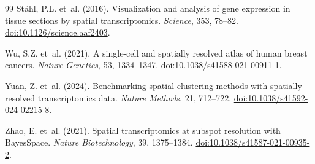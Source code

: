 \documentclass[12pt]{article}
\begin{document}
\begin{thebibliography}{99}
St{\aa}hl, P.L. et~al. (2016). Visualization and analysis of gene expression
in tissue sections by spatial transcriptomics. \emph{Science}, 353, 78--82.
\href{https://doi.org/10.1126/science.aaf2403}{doi:10.1126/science.aaf2403}.

Wu, S.Z. et~al. (2021). A single-cell and spatially resolved atlas of human
breast cancers. \emph{Nature Genetics}, 53, 1334--1347.
\href{https://doi.org/10.1038/s41588-021-00911-1}{doi:10.1038/s41588-021-00911-1}.

Yuan, Z. et~al. (2024). Benchmarking spatial clustering methods with spatially
resolved transcriptomics data. \emph{Nature Methods}, 21, 712--722.
\href{https://doi.org/10.1038/s41592-024-02215-8}{doi:10.1038/s41592-024-02215-8}.

Zhao, E. et~al. (2021). Spatial transcriptomics at subspot resolution with
BayesSpace. \emph{Nature Biotechnology}, 39, 1375--1384.
\href{https://doi.org/10.1038/s41587-021-00935-2}{doi:10.1038/s41587-021-00935-2}.

\end{thebibliography}
\end{document}
